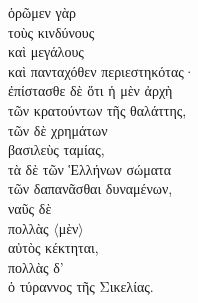{\large
\begin{greek}
\noindent ὁρῶμεν γὰρ \\
τοὺς κινδύνους \\
\tabto{2em} καὶ μεγάλους \\
\tabto{2em} καὶ πανταχόθεν περιεστηκότας· \\
ἐπίστασθε δὲ 
\tabto{2em} ὅτι ἡ μὲν ἀρχὴ \\
\tabto{4em} τῶν κρατούντων τῆς θαλάττης, \\
\tabto{2em} τῶν δὲ χρημάτων \\
\tabto{4em} βασιλεὺς ταμίας, \\
\tabto{2em} τὰ δὲ τῶν Ἑλλήνων σώματα \\
\tabto{4em} τῶν δαπανᾶσθαι δυναμένων, \\
\tabto{2em} ναῦς δὲ \\
\tabto{4em} πολλὰς $\langle$μὲν$\rangle$ \\
\tabto{6em} αὐτὸς κέκτηται, \\
\tabto{4em} πολλὰς δ' \\
\tabto{6em} ὁ τύραννος τῆς Σικελίας. \\

\end{greek}
}

